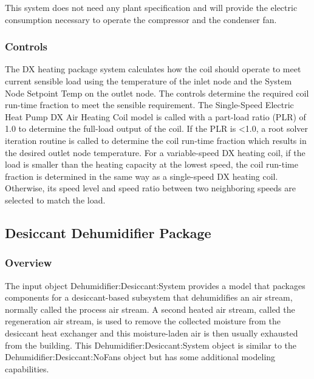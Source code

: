 This system does not need any plant specification and will provide the electric consumption necessary to operate the compressor and the condenser fan.

\subsubsection{Controls}\label{controls-2}

The DX heating package system calculates how the coil should operate to meet current sensible load using the temperature of the inlet node and the System Node Setpoint Temp on the outlet node. The controls determine the required coil run-time fraction to meet the sensible requirement. The Single-Speed Electric Heat Pump DX Air Heating Coil model is called with a part-load ratio (PLR) of 1.0 to determine the full-load output of the coil. If the PLR is \textless{}1.0, a root solver iteration routine is called to determine the coil run-time fraction which results in the desired outlet node temperature. For a variable-speed DX heating coil, if the load is smaller than the heating capacity at the lowest speed, the coil run-time fraction is determined in the same way as a single-speed DX heating coil. Otherwise, its speed level and speed ratio between two neighboring speeds are selected to match the load.

\subsection{Desiccant Dehumidifier Package}\label{desiccant-dehumidifier-package}

\subsubsection{Overview}\label{overview-7}

The input object Dehumidifier:Desiccant:System provides a model that packages components for a desiccant-based subsystem that dehumidifies an air stream, normally called the process air stream. A second heated air stream, called the regeneration air stream, is used to remove the collected moisture from the desiccant heat exchanger and this moisture-laden air is then usually exhausted from the building. This Dehumidifier:Desiccant:System object is similar to the Dehumidifier:Desiccant:NoFans object but has some additional modeling capabilities.

